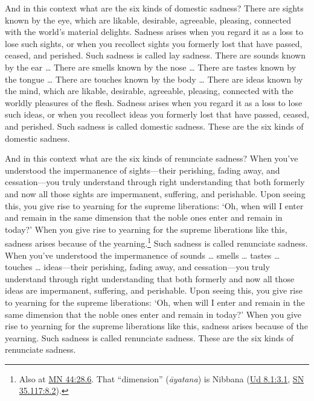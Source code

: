 \documentclass[12pt,openany]{book}%
\begin{document}
And in this context what are the six kinds of domestic sadness? There are sights known by the eye, which are likable, desirable, agreeable, pleasing, connected with the world’s material delights. Sadness arises when you regard it as a loss to lose such sights, or when you recollect sights you formerly lost that have passed, ceased, and perished. Such sadness is called lay sadness. There are sounds known by the ear … There are smells known by the nose … There are tastes known by the tongue … There are touches known by the body … There are ideas known by the mind, which are likable, desirable, agreeable, pleasing, connected with the worldly pleasures of the flesh. Sadness arises when you regard it as a loss to lose such ideas, or when you recollect ideas you formerly lost that have passed, ceased, and perished. Such sadness is called domestic sadness. These are the six kinds of domestic sadness. 

And in this context what are the six kinds of renunciate sadness? When you’ve understood the impermanence of sights—their perishing, fading away, and cessation—you truly understand through right understanding that both formerly and now all those sights are impermanent, suffering, and perishable. Upon seeing this, you give rise to yearning for the supreme liberations: ‘Oh, when will I enter and remain in the same dimension that the noble ones enter and remain in today?’ When you give rise to yearning for the supreme liberations like this, sadness arises because of the yearning.\footnote{Also at \href{https://suttacentral.net/mn44/en/sujato\#28.6}{MN 44:28.6}. That “dimension” (\textit{\textsanskrit{āyatana}}) is Nibbana (\href{https://suttacentral.net/ud8.1/en/sujato\#3.1}{Ud 8.1:3.1}, \href{https://suttacentral.net/sn35.117/en/sujato\#8.2}{SN 35.117:8.2}). } Such sadness is called renunciate sadness. When you’ve understood the impermanence of sounds … smells … tastes … touches … ideas—their perishing, fading away, and cessation—you truly understand through right understanding that both formerly and now all those ideas are impermanent, suffering, and perishable. Upon seeing this, you give rise to yearning for the supreme liberations: ‘Oh, when will I enter and remain in the same dimension that the noble ones enter and remain in today?’ When you give rise to yearning for the supreme liberations like this, sadness arises because of the yearning. Such sadness is called renunciate sadness. These are the six kinds of renunciate sadness. 
\end{document}
